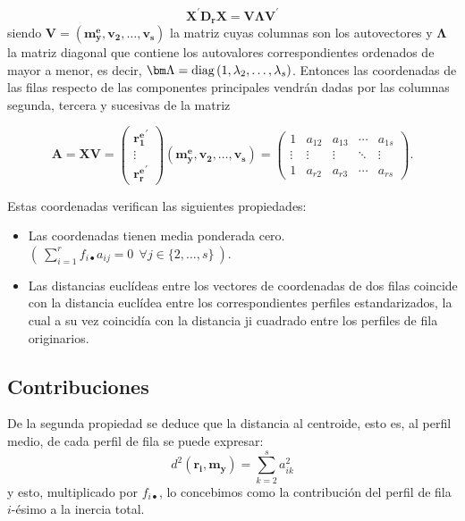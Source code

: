 \documentclass[
  a4paper,
  oneside]{scrbook}
\theoremstyle{definition}
\theoremstyle{definition}
\theoremstyle{definition}
\theoremstyle{definition}
\theoremstyle{remark}
\begin{document}
\[\bm{X^{\prime} D_r X}=\bm{V}\bm{\Lambda}\bm{V}^{\prime}\] siendo
\(\bm{V}=(\bm{m_y^e}, \bm{v_2}, \ldots, \bm{v_s})\) la matriz cuyas
columnas son los autovectores y \(\bm\Lambda\) la matriz diagonal que
contiene los autovalores correspondientes ordenados de mayor a menor, es
decir,
\(\bm\Lambda=\textnormal{diag} \left(1,\lambda_2,\ldots,\lambda_{s}\right)\).
Entonces las coordenadas de las filas respecto de las componentes
principales vendrán dadas por las columnas segunda, tercera y sucesivas
de la matriz

\[\bm{A}=\bm{XV}
=\left(\begin{array}{c} {\bm{r_1^e}}^\prime{} \\ \vdots \\  {\bm{r_r^e}}^\prime{} \end{array}\right)
\left(\bm{m_y^e}, \bm{v_2}, \ldots, \bm{v_s}\right)
=\left(\begin{array}{ccccc}
1 & a_{12} & a_{13} & \cdots & a_{1s} \\
\vdots & \vdots & \vdots & \ddots & \vdots \\
1 & a_{r2} & a_{r3} & \cdots & a_{rs} \end{array}\right).\]

Estas coordenadas verifican las siguientes propiedades:

\begin{itemize}
\item
  Las coordenadas tienen media ponderada cero.
  \(\left(\ \sum_{i=1}^r f_{i\bullet} a_{ij}=0\ \ \forall j\in\{2,\ldots,s\}\ \right).\)
\item
  Las distancias euclídeas entre los vectores de coordenadas de dos
  filas coincide con la distancia euclídea entre los correspondientes
  perfiles estandarizados, la cual a su vez coincidía con la distancia
  ji cuadrado entre los perfiles de fila originarios.
\end{itemize}

\subsection{Contribuciones}\label{contribuciones}

De la segunda propiedad se deduce que la distancia al centroide, esto
es, al perfil medio, de cada perfil de fila se puede expresar:
\[d^2(\bm{r_i},\bm{m_y})=\sum_{k=2}^s a_{ik}^2\] y esto, multiplicado
por \(f_{i\bullet}\), lo concebimos como la contribución del perfil de
fila \(i\)-ésimo a la inercia total.
\end{document}
